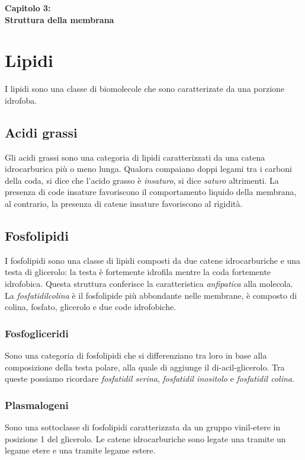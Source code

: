 \Large\textbf{Capitolo 3: \\ Struttura della membrana}

\section{Lipidi}
\small
    I lipidi sono una classe di biomolecole che sono caratterizate da una porzione idrofoba. 
    
    \subsection{Acidi grassi}
        Gli acidi grassi sono una categoria di lipidi caratterizzati da una catena idrocarburica più o meno lunga. Qualora compaiano doppi legami tra i carboni della coda, si dice che l'acido grasso è \textit{insaturo}, si dice \textit{saturo} altrimenti. La presenza di code insature favoriscono il comportamento liquido della membrana, al contrario, la presenza di catene insature favoriscono al rigidità.
        
    \subsection{Fosfolipidi}
        I fosfolipidi sono una classe di lipidi composti da due catene idrocarburiche e una testa di glicerolo: la testa è fortemente idrofila mentre la coda fortemente idrofobica.
        Questa struttura conferisce la caratteristica \textit{anfipatica} alla molecola.\\
        La \textit{fosfatidilcolina} è il fosfolipide più abbondante nelle membrane, è composto di colina, fosfato, glicerolo e due code idrofobiche.
        \subsubsection{Fosfogliceridi}
            Sono una categoria di fosfolipidi che si differenziano tra loro in base alla composizione della testa polare, alla quale di aggiunge il di-acil-glicerolo. Tra queste possiamo ricordare \textit{fosfatidil serina}, \textit{fosfatidil inositolo} e \textit{fosfatidil colina}.
            
        \subsubsection{Plasmalogeni}
            Sono una sottoclasse di fosfolipidi caratterizzata da un gruppo vinil-etere in posizione 1 del glicerolo. Le catene idrocarburiche sono legate una tramite un legame etere e una tramite legame estere.
        
